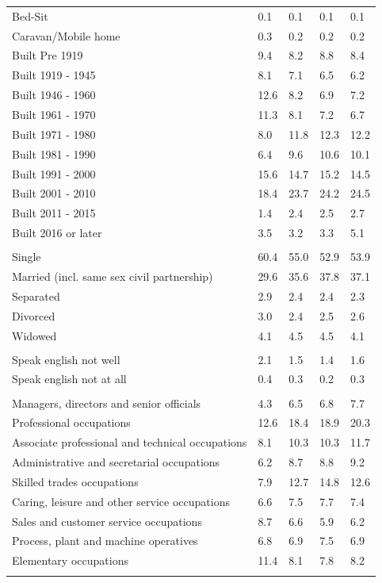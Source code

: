 \documentclass{article}
\begin{document}
\begin{table}[h]
\begin{tabular}{KTTTT}
Bed-Sit & 0.1& 0.1& 0.1& 0.1\\
Caravan/Mobile home & 0.3& 0.2& 0.2& 0.2\\
    \hline
Built Pre 1919 & 9.4& 8.2& 8.8& 8.4\\
Built 1919 - 1945 & 8.1& 7.1& 6.5& 6.2\\
Built  1946 - 1960 & 12.6&  8.2&  6.9&  7.2\\
Built  1961 - 1970 & 11.3&  8.1&  7.2&  6.7\\
Built  1971 - 1980 &  8.0& 11.8& 12.3& 12.2\\
Built  1981 - 1990 &  6.4&  9.6& 10.6& 10.1\\
Built  1991 - 2000 & 15.6& 14.7& 15.2& 14.5\\
Built  2001 - 2010 & 18.4& 23.7& 24.2& 24.5\\
Built  2011 - 2015 & 1.4& 2.4& 2.5& 2.7\\
Built  2016 or later & 3.5& 3.2& 3.3& 5.1\\
\hline
    \\
    \hline
Single & 60.4& 55.0& 52.9& 53.9\\
Married (incl. same sex civil partnership) & 29.6& 35.6& 37.8& 37.1\\
Separated  & 2.9& 2.4& 2.4& 2.3\\
Divorced  & 3.0& 2.4& 2.5& 2.6\\
Widowed & 4.1& 4.5& 4.5& 4.1\\
\hline
    \\ 
    \hline
Speak english not well & 2.1& 1.5& 1.4& 1.6\\
Speak english not at all & 0.4& 0.3& 0.2& 0.3\\
\hline
    \\
    \hline
Managers, directors and senior officials & 4.3& 6.5& 6.8& 7.7\\
Professional occupations & 12.6& 18.4& 18.9& 20.3\\
Associate professional and technical occupations &  8.1& 10.3& 10.3& 11.7\\
Administrative and secretarial occupations & 6.2& 8.7& 8.8& 9.2\\
Skilled trades occupations &  7.9& 12.7& 14.8& 12.6\\
Caring, leisure and other service occupations & 6.6& 7.5& 7.7& 7.4\\
Sales and customer service occupations & 8.7& 6.6& 5.9& 6.2\\
Process, plant and machine operatives & 6.8& 6.9& 7.5& 6.9\\
Elementary occupations & 11.4&  8.1&  7.8&  8.2\\
\hline
\end{tabular}
\end{table}
\end{document}
